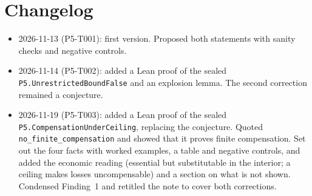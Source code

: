 \documentclass[11pt]{article}
\theoremstyle{remark}
\begin{document}
\section{Changelog}
\begin{itemize}
\item 2026-11-13 (P5-T001): first version. Proposed both statements with sanity checks and
negative controls.
\item 2026-11-14 (P5-T002): added a Lean proof of the sealed \texttt{P5.UnrestrictedBoundFalse}
and an explosion lemma. The second correction remained a conjecture.
\item 2026-11-19 (P5-T003): added a Lean proof of the sealed \texttt{P5.CompensationUnderCeiling},
replacing the conjecture. Quoted \texttt{no\_finite\_compensation} and showed that it proves
finite compensation. Set out the four facts with worked examples, a table and negative controls,
and added the economic reading (essential but substitutable in the interior; a ceiling makes
losses uncompensable) and a section on what is not shown. Condensed Finding~1 and retitled the
note to cover both corrections.
\end{itemize}



\end{document}
